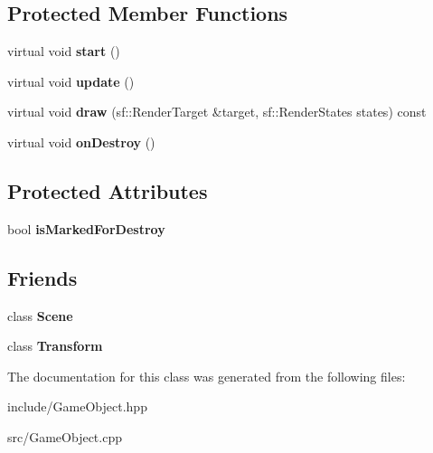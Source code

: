 \subsection*{Protected Member Functions}
\begin{DoxyCompactItemize}
\item 
\hypertarget{class_game_object_a4abb95a00e491aa09dc540f4bc9b9340}{virtual void {\bfseries start} ()}\label{class_game_object_a4abb95a00e491aa09dc540f4bc9b9340}

\item 
\hypertarget{class_game_object_ad4a07f19f6c5e2e71c89c07486f26244}{virtual void {\bfseries update} ()}\label{class_game_object_ad4a07f19f6c5e2e71c89c07486f26244}

\item 
\hypertarget{class_game_object_a3288cf2d607a7d44c3d9f0ac700cbda0}{virtual void {\bfseries draw} (sf\-::\-Render\-Target \&target, sf\-::\-Render\-States states) const }\label{class_game_object_a3288cf2d607a7d44c3d9f0ac700cbda0}

\item 
\hypertarget{class_game_object_a48bd07f9773dce443eb755477dee7dad}{virtual void {\bfseries on\-Destroy} ()}\label{class_game_object_a48bd07f9773dce443eb755477dee7dad}

\end{DoxyCompactItemize}
\subsection*{Protected Attributes}
\begin{DoxyCompactItemize}
\item 
\hypertarget{class_game_object_afac7336fdac6c19da71c790c61b509df}{bool {\bfseries is\-Marked\-For\-Destroy}}\label{class_game_object_afac7336fdac6c19da71c790c61b509df}

\end{DoxyCompactItemize}
\subsection*{Friends}
\begin{DoxyCompactItemize}
\item 
\hypertarget{class_game_object_a032858ae1fe02d2d1170981c2af2d67c}{class {\bfseries Scene}}\label{class_game_object_a032858ae1fe02d2d1170981c2af2d67c}

\item 
\hypertarget{class_game_object_af851b4d9aacd1a871da33592334b8d72}{class {\bfseries Transform}}\label{class_game_object_af851b4d9aacd1a871da33592334b8d72}

\end{DoxyCompactItemize}


The documentation for this class was generated from the following files\-:\begin{DoxyCompactItemize}
\item 
include/Game\-Object.\-hpp\item 
src/Game\-Object.\-cpp\end{DoxyCompactItemize}
